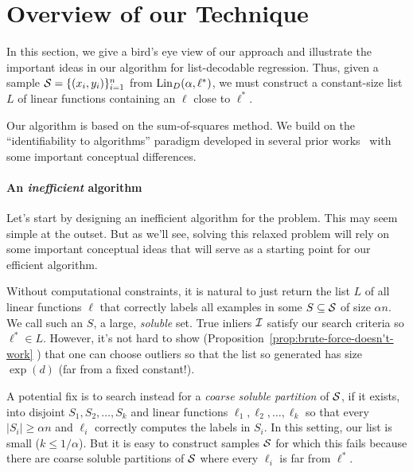 



\section{Overview of our Technique} \label{sec:overview}
In this section, we give a bird's eye view of our approach and illustrate the important ideas in our algorithm for list-decodable regression. 
Thus, given a sample $\mathcal S = \{(x_i,y_i)\}_{i = 1}^n$ from $\mathrm{Lin}_D(\alpha,\ell^*)$, we must construct a constant-size list $L$ of linear functions containing an $\ell$ close to $\ell^*$. 

Our algorithm is based on the sum-of-squares method. We build on the ``identifiability to algorithms'' paradigm developed in several prior works~\cite{DBLP:conf/colt/BarakM16,MR3388192-Barak15,DBLP:conf/focs/MaSS16,2017KS,HopkinsLi17,KothariSteinhardt17,DBLP:conf/colt/KlivansKM18} with some important conceptual differences. 

\paragraph{An \emph{inefficient} algorithm} Let's start by designing an inefficient algorithm for the problem. This may seem simple at the outset. But as we'll see, solving this relaxed problem will rely on some important conceptual ideas that will serve as a starting point for our efficient algorithm. 

Without computational constraints, it is natural to just return the list $L$ of all linear functions $\ell$ that correctly labels all examples in some $S \subseteq \mathcal S$ of size $\alpha n$. We call such an $S$, a large, \emph{soluble} set. True inliers $\mathcal I$ satisfy our search criteria so $\ell^* \in L$. However, it's not hard to show (Proposition~\ref{prop:brute-force-doesn't-work} ) that one can choose outliers so that the list so generated has size $\exp(d)$ (far from a fixed constant!).

A potential fix is to search instead for a \emph{coarse soluble partition} of $\mathcal S$, if it exists, into disjoint $S_1, S_2,\ldots, S_k$ and  linear functions $\ell_1, \ell_2, \ldots, \ell_k$ so that every $|S_i| \geq \alpha n$ and $\ell_i$ correctly computes the labels in $S_i$. In this setting, our list is small ($k\leq 1/\alpha$). But it is easy to construct samples $\mathcal S$ for which this fails 
because there are coarse soluble partitions of $\mathcal S$ where every $\ell_i$ is far from $\ell^*$. %
